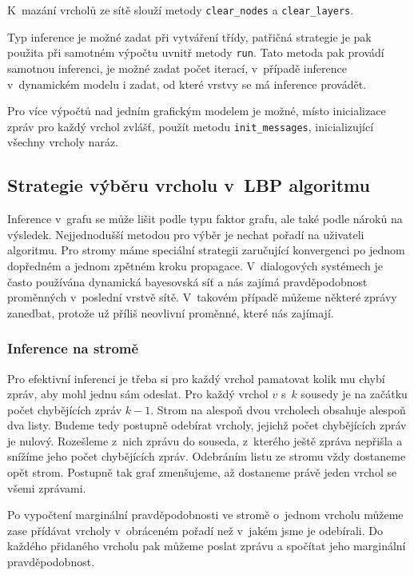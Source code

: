 K~mazání vrcholů ze sítě slouží metody \texttt{clear\_nodes} a \texttt{clear\_layers}.

Typ inference je možné zadat při vytváření třídy, patřičná strategie je pak použita při samotném výpočtu uvnitř metody \texttt{run}. 
Tato metoda pak provádí samotnou inferenci, je možné zadat počet iterací, v~případě inference v~dynamickém modelu i zadat, od které vrstvy se má inference provádět.

Pro více výpočtů nad jedním grafickým modelem je možné, místo inicializace zpráv pro každý vrchol zvlášť, použít metodu \texttt{init\_messages}, inicializující všechny vrcholy naráz.

\subsection{Strategie výběru vrcholu v~LBP algoritmu}
\label{sec:noch}

Inference v~grafu se může lišit podle typu faktor grafu, ale také podle nároků na výsledek.
Nejjednodušší metodou pro výběr je nechat pořadí na uživateli algoritmu.
Pro stromy máme speciální strategii zaručující konvergenci po jednom dopředném a jednom zpětném kroku propagace.
V~dialogových systémech je často používána dynamická bayesovská síť a nás zajímá pravděpodobnost proměnných v~poslední vrstvě sítě.
V~takovém případě můžeme některé zprávy zanedbat, protože už příliš neovlivní proměnné, které nás zajímají.

\subsubsection{Inference na stromě}

Pro efektivní inferenci je třeba si pro každý vrchol pamatovat kolik mu chybí zpráv, aby mohl jednu sám odeslat.
Pro každý vrchol $v$ s~$k$ sousedy je na začátku počet chybějících zpráv $k-1$.
Strom na alespoň dvou vrcholech obsahuje alespoň dva listy.
Budeme tedy postupně odebírat vrcholy, jejichž počet chybějících zpráv je nulový.
Rozešleme z~nich zprávu do souseda, z~kterého ještě zpráva nepřišla a snížíme jeho počet chybějících zpráv.
Odebráním listu ze stromu vždy dostaneme opět strom.
Postupně tak graf zmenšujeme, až dostaneme právě jeden vrchol se všemi zprávami.

Po vypočtení marginální pravděpodobnosti ve stromě o~jednom vrcholu můžeme zase přídávat vrcholy v~obráceném pořadí než v~jakém jsme je odebírali.
Do každého přidaného vrcholu pak můžeme poslat zprávu a spočítat jeho marginální pravděpodobnost.

